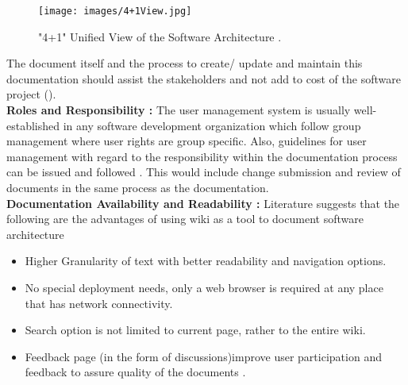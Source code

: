 \begin{figure}[H]
  \centering
  \texttt{[image: images/4+1View.jpg]}
  \caption["4+1" Unified View of the Software Architecture \cite{bab2009}]{"4+1" Unified View of the Software Architecture \cite{bab2009}.}\label{fig:4_1_view}
\end{figure}
\indent The document itself and the process to create/ update and maintain this documentation should assist the stakeholders and not add to cost of the software project (\cite{Shahin2014}).
\newline
\\\indent \textbf{Roles and Responsibility : }The user management system is usually well-established in any software development organization which follow group management where user rights are group specific. Also, guidelines for user management with regard to the responsibility within the documentation process can be issued and followed \cite{5314237}. This would include change submission and review of documents in the same process as the documentation.
\newline
\\\indent \textbf{Documentation Availability and Readability : } Literature suggests that the following are the advantages of using wiki as a tool to document software architecture \cite{Bachmann2005}
\begin{itemize}
\item Higher Granularity of text with better readability and navigation options.
\item No special deployment needs, only a web browser is required at any place that has network connectivity.
\item Search option is not limited to current page, rather to the entire wiki.
\item Feedback page (in the form of discussions)improve user participation and feedback to assure quality of the documents \cite{Zhao2003}.
\end{itemize}


